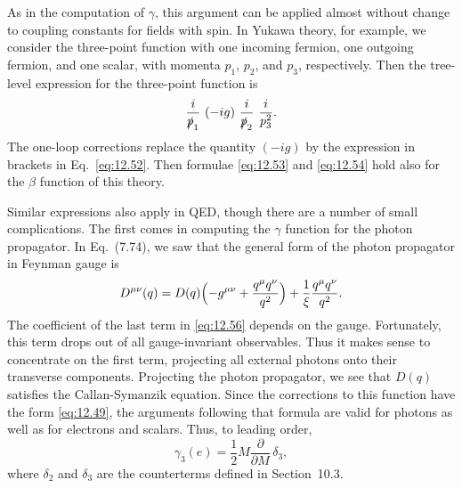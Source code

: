 As in the computation of $\gamma$, this argument can be applied almost
without change to coupling constants for fields with spin.  In Yukawa theory,
for example, we consider the three-point function with one incoming fermion,
one outgoing fermion, and one scalar, with momenta $p_1$, $p_2$, and $p_3$,
respectively.  Then the tree-level expression for the three-point function
is
\begin{equation}
  \frac{i}{\slashed{p}_1}\ (-ig)\ \frac{i}{\slashed{p}_2}\ \frac{i}{p_3^2}
  .
  \label{eq:12.55}
\end{equation}
The one-loop corrections replace the quantity $(-ig)$ by the expression in
brackets in Eq.~\eqref{eq:12.52}.  Then formulae \eqref{eq:12.53} and
\eqref{eq:12.54} hold also for the $\beta$ function of this theory.

Similar expressions also apply in QED, though there are a number of small
complications.  The first comes in computing the $\gamma$ function for the
photon propagator.  In Eq.~(7.74), we saw that the general form of
the photon propagator in Feynman gauge is
\begin{equation}
  D^{\mu\nu}(q) = D(q)\Bigl( -g^{\mu\nu} + \frac{q^\mu q^\nu}{q^2} \Bigr)
    + \frac{1}{\xi}\frac{q^\mu q^\nu}{q^2} .
  \label{eq:12.56}
\end{equation}
The coefficient of the last term in \eqref{eq:12.56} depends on the gauge.
Fortunately, this term drops out of all gauge-invariant observables.  Thus it
makes sense to concentrate on the first term, projecting all external photons
onto their transverse components.  Projecting the photon propagator, we see
that $D(q)$ satisfies the Callan-Symanzik equation.  Since the corrections to
this function have the form \eqref{eq:12.49}, the arguments following that
formula are valid for photons as well as for electrons and scalars.  Thus, to
leading order,
\begin{equation}
  \gamma_3(e) = \frac{1}{2}M\frac{\partial}{\partial M}\,\delta_3 ,
  \label{eq:12.57}
\end{equation}
where $\delta_2$ and $\delta_3$ are the counterterms defined in
Section~10.3.

